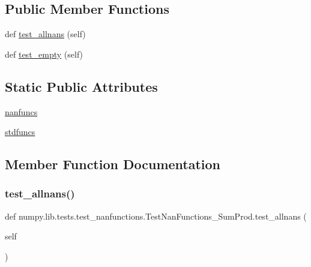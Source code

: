 \subsection*{Public Member Functions}
\begin{DoxyCompactItemize}
\item 
def \hyperlink{classnumpy_1_1lib_1_1tests_1_1test__nanfunctions_1_1TestNanFunctions__SumProd_a6cce3dd624ec3fa1ddff4837a2381b9f}{test\+\_\+allnans} (self)
\item 
def \hyperlink{classnumpy_1_1lib_1_1tests_1_1test__nanfunctions_1_1TestNanFunctions__SumProd_ad7fcf1004a228710c7d28fde7b4dbd49}{test\+\_\+empty} (self)
\end{DoxyCompactItemize}
\subsection*{Static Public Attributes}
\begin{DoxyCompactItemize}
\item 
\hyperlink{classnumpy_1_1lib_1_1tests_1_1test__nanfunctions_1_1TestNanFunctions__SumProd_a2a864806825dc9279fe9eb1ee02446fb}{nanfuncs}
\item 
\hyperlink{classnumpy_1_1lib_1_1tests_1_1test__nanfunctions_1_1TestNanFunctions__SumProd_ab3f5fc56c04a1858fee66a753f333581}{stdfuncs}
\end{DoxyCompactItemize}


\subsection{Member Function Documentation}
\mbox{\label{classnumpy_1_1lib_1_1tests_1_1test__nanfunctions_1_1TestNanFunctions__SumProd_a6cce3dd624ec3fa1ddff4837a2381b9f}} 
\subsubsection{\texorpdfstring{test\+\_\+allnans()}{test\_allnans()}}
{\footnotesize\ttfamily def numpy.\+lib.\+tests.\+test\+\_\+nanfunctions.\+Test\+Nan\+Functions\+\_\+\+Sum\+Prod.\+test\+\_\+allnans (\begin{DoxyParamCaption}\item[{}]{self }\end{DoxyParamCaption})}

